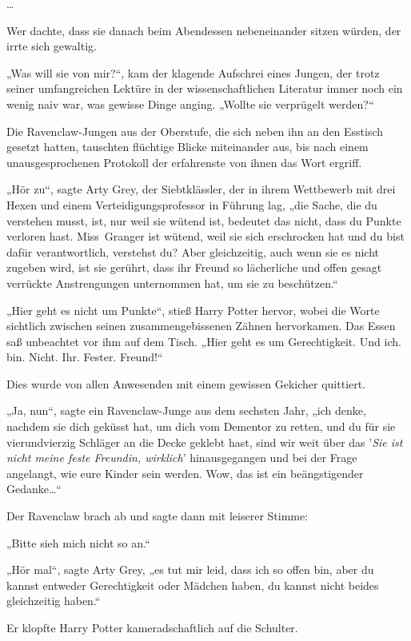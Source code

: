 {…

Wer dachte, dass sie danach beim Abendessen nebeneinander sitzen würden, der irrte sich gewaltig.

„Was will sie von mir?“, kam der klagende Aufschrei eines Jungen, der trotz seiner umfangreichen Lektüre in der wissenschaftlichen Literatur immer noch ein wenig naiv war, was gewisse Dinge anging. „Wollte sie verprügelt werden?“

Die Ravenclaw-Jungen aus der Oberstufe, die sich neben ihn an den Esstisch gesetzt hatten, tauschten flüchtige Blicke miteinander aus, bis nach einem unausgesprochenen Protokoll der erfahrenste von ihnen das Wort ergriff.

„Hör zu“, sagte Arty Grey, der Siebtklässler, der in ihrem Wettbewerb mit drei Hexen und einem Verteidigungsprofessor in Führung lag, „die Sache, die du verstehen musst, ist, nur weil sie wütend ist, bedeutet das nicht, dass du Punkte verloren hast. Miss~Granger ist wütend, weil sie sich erschrocken hat und du bist dafür verantwortlich, verstehst du? Aber gleichzeitig, auch wenn sie es nicht zugeben wird, ist sie gerührt, dass ihr Freund so lächerliche und offen gesagt verrückte Anstrengungen unternommen hat, um sie zu beschützen.“

„Hier geht es nicht um Punkte“, stieß Harry Potter hervor, wobei die Worte sichtlich zwischen seinen zusammengebissenen Zähnen hervorkamen. Das Essen saß unbeachtet vor ihm auf dem Tisch. „Hier geht es um Gerechtigkeit. Und ich. bin. Nicht. Ihr. Fester. Freund!“

Dies wurde von allen Anwesenden mit einem gewissen Gekicher quittiert.

„Ja, nun“, sagte ein Ravenclaw-Junge aus dem sechsten Jahr, „ich denke, nachdem sie dich geküsst hat, um dich vom Dementor zu retten, und du für sie vierundvierzig Schläger an die Decke geklebt hast, sind wir weit über das '\emph{Sie ist nicht meine feste Freundin, wirklich}' hinausgegangen und bei der Frage angelangt, wie eure Kinder sein werden. Wow, das ist ein beängstigender Gedanke…“

Der Ravenclaw brach ab und sagte dann mit leiserer Stimme:

„Bitte sieh mich nicht so an.“

„Hör mal“, sagte Arty Grey, „es tut mir leid, dass ich so offen bin, aber du kannst entweder Gerechtigkeit oder Mädchen haben, du kannst nicht beides gleichzeitig haben.“

Er klopfte Harry Potter kameradschaftlich auf die Schulter.

}

